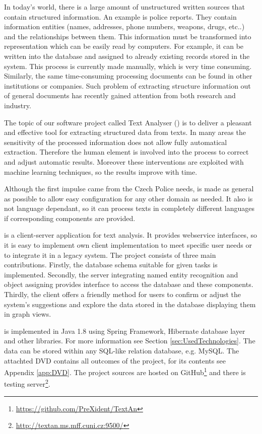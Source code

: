 
In today's world, there is a large amount of unstructured written sources that contain structured information. An example is police reports. They contain
information entities (names, addresses, phone numbers, weapons, drugs, etc..)
and the relationships between them. This information must be transformed into
representation which can be easily read by computers. For example, it can be
written into the database and assigned to already existing records stored in
the system. This process is currently made manually, which is very time 
consuming. Similarly, the same time-consuming processing documents can be found
in other institutions or companies. Such problem of extracting structure
information out of general documents has recently gained attention from both
research and industry.

The topic of our software project called Text Analyser (\textan{}) is to
deliver a pleasant and effective tool for extracting structured data from texts.
In many areas the sensitivity of the processed information does not allow fully
automatical extraction. Therefore the human element is involved into the process
to correct and adjust automatic results. Moreover these interventions are
exploited with machine learning techniques, so the results improve with time.

Although the first impulse came from the Czech Police needs, \textan{} is made
as general as possible to allow easy configuration for any other domain as
needed. It also is not language dependant, so it can process texts in completely
different languages if corresponding components are provided.

\textan{} is a client-server application for text analysis. It provides
webservice interfaces, so it is easy to implement own client implementation to
meet specific user needs or to integrate it in a legacy system. The project
consists of three main contributions. Firstly, the database schema suitable for
given tasks is implemented. Secondly, the server integrating named entity
recognition and object assigning provides interface to access the database and
these components. Thirdly, the client offers a friendly method for users to
confirm or adjust the system's suggestions and explore the data stored in the
database displaying them in graph views.

\textan{} is implemented in Java 1.8 using Spring Framework, Hibernate database
layer and other libraries. For more information see Section
\ref{sec:UsedTechnologies}. The data can be stored within any SQL-like relation
database, e.g. MySQL. The attachted DVD contains all outcomes of the project,
for its contents see Appendix \ref{app:DVD}. The project sources are hosted
on GitHub\footnote{\url{https://github.com/PreXident/TextAn}} and there is
testing server\footnote{\url{http://textan.ms.mff.cuni.cz:9500/}}.

